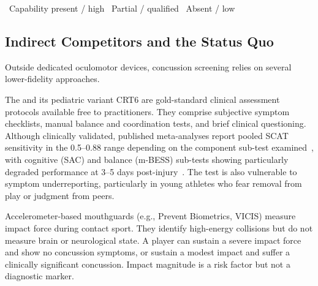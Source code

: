 \begin{table}[htbp]
    \smallskip
    {\small \hbfull~Capability present / high \hspace{1.5em}
            \hbhalf~Partial / qualified \hspace{1.5em}
            \hbnone~Absent / low}

    \caption{Competitor feature comparison across the major dedicated oculomotor and concussion-screening tools. Binary columns (, smooth pursuit, vergence) mark whether the device measures the biomarker at all; repeatability and portability are scored qualitatively (high / partial / low). Indicative cost reflects the most-publicly-cited list or subscription price; see  for full sourcing. Our device is intentionally excluded from this table because its capability claims are pre-clinical-validation; its design-target position is shown separately in . Concussion-management workflow platforms (Luca Health, Return2Play and similar) capture no biomarkers and are discussed separately in .}
    \label{tab:ent-competitor-features}
\end{table}


\subsection{Indirect Competitors and the Status Quo}
\label{sec:ent-indirect-competitors}

Outside dedicated oculomotor devices, concussion screening relies on several lower-fidelity approaches.

The  and its pediatric variant CRT6 are gold-standard clinical assessment protocols available free to practitioners. They comprise subjective symptom checklists, manual balance and coordination tests, and brief clinical questioning. Although clinically validated, published meta-analyses report pooled SCAT sensitivity in the 0.5--0.88 range depending on the component sub-test examined~\cite{dharnipragada2023scat}, with cognitive (SAC) and balance (m-BESS) sub-tests showing particularly degraded performance at 3--5 days post-injury~\cite{downey2018scat3}. The test is also vulnerable to symptom underreporting, particularly in young athletes who fear removal from play or judgment from peers.

Accelerometer-based mouthguards (e.g., Prevent Biometrics, VICIS) measure impact force during contact sport. They identify high-energy collisions but do not measure brain or neurological state. A player can sustain a severe impact force and show no concussion symptoms, or sustain a modest impact and suffer a clinically significant concussion. Impact magnitude is a risk factor but not a diagnostic marker.

